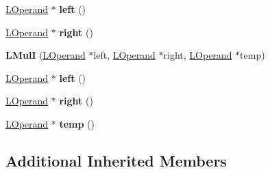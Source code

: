 \begin{DoxyCompactItemize}
\item 
\hyperlink{classv8_1_1internal_1_1_l_operand}{L\+Operand} $\ast$ {\bfseries left} ()\hypertarget{classv8_1_1internal_1_1_l_mul_i_ae68736354423918dde94b30e0d86ecf4}{}\label{classv8_1_1internal_1_1_l_mul_i_ae68736354423918dde94b30e0d86ecf4}

\item 
\hyperlink{classv8_1_1internal_1_1_l_operand}{L\+Operand} $\ast$ {\bfseries right} ()\hypertarget{classv8_1_1internal_1_1_l_mul_i_a71251abcac64e497fe599adf9d8150e2}{}\label{classv8_1_1internal_1_1_l_mul_i_a71251abcac64e497fe599adf9d8150e2}

\item 
{\bfseries L\+MulI} (\hyperlink{classv8_1_1internal_1_1_l_operand}{L\+Operand} $\ast$left, \hyperlink{classv8_1_1internal_1_1_l_operand}{L\+Operand} $\ast$right, \hyperlink{classv8_1_1internal_1_1_l_operand}{L\+Operand} $\ast$temp)\hypertarget{classv8_1_1internal_1_1_l_mul_i_a37918016a1518a2c0b86dbd938267754}{}\label{classv8_1_1internal_1_1_l_mul_i_a37918016a1518a2c0b86dbd938267754}

\item 
\hyperlink{classv8_1_1internal_1_1_l_operand}{L\+Operand} $\ast$ {\bfseries left} ()\hypertarget{classv8_1_1internal_1_1_l_mul_i_ae68736354423918dde94b30e0d86ecf4}{}\label{classv8_1_1internal_1_1_l_mul_i_ae68736354423918dde94b30e0d86ecf4}

\item 
\hyperlink{classv8_1_1internal_1_1_l_operand}{L\+Operand} $\ast$ {\bfseries right} ()\hypertarget{classv8_1_1internal_1_1_l_mul_i_a71251abcac64e497fe599adf9d8150e2}{}\label{classv8_1_1internal_1_1_l_mul_i_a71251abcac64e497fe599adf9d8150e2}

\item 
\hyperlink{classv8_1_1internal_1_1_l_operand}{L\+Operand} $\ast$ {\bfseries temp} ()\hypertarget{classv8_1_1internal_1_1_l_mul_i_a1a8cb82af8429674505bfd4197c4af2a}{}\label{classv8_1_1internal_1_1_l_mul_i_a1a8cb82af8429674505bfd4197c4af2a}

\end{DoxyCompactItemize}
\subsection*{Additional Inherited Members}


